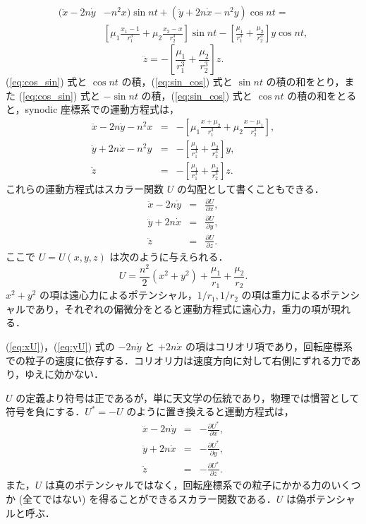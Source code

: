 \documentclass[11pt,a4paper,oneside,onecolumn]{jreport}
\begin{document}
\begin{equation}
\begin{split}
(\ddot{x} - 2 n \dot{y} & - n^2 x) \sin nt + (\ddot{y} + 2 n \dot{x} - n^2 y) \cos nt =\\
& \left[ \mu_1 \frac{x_1 - 1}{r_1^3} + \mu_2 \frac{x_2 - x}{r_2^3} \right] \sin nt - \left[ \frac{\mu_1}{r_1^3} + \frac{\mu_2}{r_2^3} \right] y \cos nt, \label{eq:sin_cos}
\end{split}
\end{equation}
\begin{equation}
\ddot{z} = - \left[ \frac{\mu_1}{r_1^3} + \frac{\mu_2}{r_2^3} \right] z.
\end{equation}
(\ref{eq:cos_sin}) 式と $\cos nt$ の積，(\ref{eq:sin_cos}) 式と $\sin nt$ の積の和をとり，また (\ref{eq:cos_sin}) 式と $- \sin nt$ の積，(\ref{eq:sin_cos}) 式と $\cos nt$ の積の和をとると，synodic 座標系での運動方程式は，
\begin{eqnarray}
\ddot{x} - 2 n \dot{y} - n^2 x & = & - \left[ \mu_1 \frac{x + \mu_2}{r_1^3} + \mu_2 \frac{x - \mu_1}{r_2^3} \right],\\
\ddot{y} + 2 n \dot{x} - n^2 y & = & - \left[ \frac{\mu_1}{r_1^3} + \frac{\mu_2}{r_2^3} \right] y,\\
\ddot{z} & = & - \left[ \frac{\mu_1}{r_1^3} + \frac{\mu_2}{r_2^3} \right] z.
\end{eqnarray}
これらの運動方程式はスカラー関数 $U$ の勾配として書くこともできる．
\begin{eqnarray}
\ddot{x} - 2 n \dot{y} & = & \frac{\partial U}{\partial x}, \label{eq:xU}\\
\ddot{y} + 2 n \dot{x} & = & \frac{\partial U}{\partial y}, \label{eq:yU}\\
\ddot{z} & = & \frac{\partial U}{\partial z}. \label{eq:zU}
\end{eqnarray}
ここで $U = U (x, y, z)$ は次のように与えられる．
\begin{equation}
U = \frac{n^2}{2} (x^2 + y^2) + \frac{\mu_1}{r_1} + \frac{\mu_2}{r_2}. \label{eq:U}
\end{equation}
$x^2 + y^2$ の項は遠心力によるポテンシャル，$1/r_1, 1/r_2$ の項は重力によるポテンシャルであり，それぞれの偏微分をとると運動方程式に遠心力，重力の項が現れる．

(\ref{eq:xU})，(\ref{eq:yU}) 式の $- 2n \dot{y}$ と $+ 2n \dot{x}$ の項はコリオリ項であり，回転座標系での粒子の速度に依存する．コリオリ力は速度方向に対して右側にずれる力であり，ゆえに効かない．

$U$ の定義より符号は正であるが，単に天文学の伝統であり，物理では慣習として符号を負にする．$U^{\ast} = - U$ のように置き換えると運動方程式は，
\begin{eqnarray}
\ddot{x} - 2 n \dot{y} & = & - \frac{\partial U^{\ast}}{\partial x}, \label{eq:xUast}\\
\ddot{y} + 2 n \dot{x} & = & - \frac{\partial U^{\ast}}{\partial y}, \label{eq:yUast}\\
\ddot{z} & = & - \frac{\partial U^{\ast}}{\partial z}. \label{eq:zUast}
\end{eqnarray}
また，$U$ は真のポテンシャルではなく，回転座標系での粒子にかかる力のいくつか (全てではない) を得ることができるスカラー関数である．$U$ は偽ポテンシャルと呼ぶ．
\end{document}

